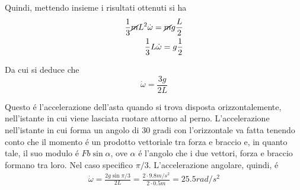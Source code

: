 \documentclass[17pt]{extarticle}
\begin{document}
Quindi, mettendo insieme i risultati ottenuti si ha
\begin{eqnarray}\nonumber
	\frac{1}{3}\cancel{m}L^2\dot{\omega} = \cancel{m}g\frac{L}{2}\\
	\frac{1}{3}L\dot{\omega} = g\frac{1}{2}
\end{eqnarray}

Da cui si deduce che 
\begin{equation}
	\dot{\omega} = \frac{3g}{2L}
\end{equation}

Questo \'e l'accelerazione dell'asta quando si trova disposta orizzontalemente, nell'istante in cui viene lasciata ruotare attorno al perno. L'accelerazione nell'istante in cui forma un angolo di 30 gradi con l'orizzontale va fatta tenendo conto che il momento \'e un prodotto vettoriale tra forza e braccio e, in quanto tale, il suo modulo \'e $Fb\sin{\alpha}$, ove $\alpha$ \'e l'angolo che i due vettori, forza e braccio formano tra loro. Nel caso specifico $\pi/3$. L'accelerazione angolare, quindi, \'e
\begin{eqnarray}
	\dot{\omega} = \frac{2g\sin{\pi/3} }{2L} = \frac{2\cdot 9.8 m/s^2}{2\cdot 0.5 m} = 25.5rad/s^2
\end{eqnarray}
\end{document}

